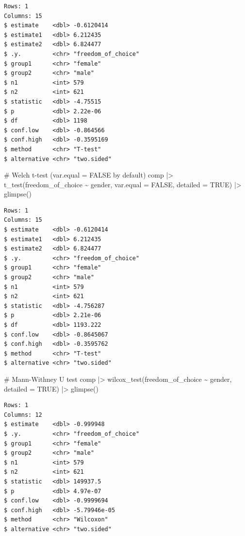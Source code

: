 \documentclass[
  letterpaper,
  DIV=11,
  numbers=noendperiod]{scrreprt}
\newenvironment{Shaded}{\begin{snugshade}}{\end{snugshade}}
\newcommand{\AttributeTok}[1]{\textcolor[rgb]{0.40,0.45,0.13}{#1}}
\newcommand{\CommentTok}[1]{\textcolor[rgb]{0.37,0.37,0.37}{#1}}
\newcommand{\ConstantTok}[1]{\textcolor[rgb]{0.56,0.35,0.01}{#1}}
\newcommand{\FunctionTok}[1]{\textcolor[rgb]{0.28,0.35,0.67}{#1}}
\newcommand{\NormalTok}[1]{\textcolor[rgb]{0.00,0.23,0.31}{#1}}
\newcommand{\SpecialCharTok}[1]{\textcolor[rgb]{0.37,0.37,0.37}{#1}}
\begin{document}
\begin{verbatim}
Rows: 1
Columns: 15
$ estimate    <dbl> -0.6120414
$ estimate1   <dbl> 6.212435
$ estimate2   <dbl> 6.824477
$ .y.         <chr> "freedom_of_choice"
$ group1      <chr> "female"
$ group2      <chr> "male"
$ n1          <int> 579
$ n2          <int> 621
$ statistic   <dbl> -4.75515
$ p           <dbl> 2.22e-06
$ df          <dbl> 1198
$ conf.low    <dbl> -0.864566
$ conf.high   <dbl> -0.3595169
$ method      <chr> "T-test"
$ alternative <chr> "two.sided"
\end{verbatim}

\begin{Shaded}
\begin{Highlighting}[]
\CommentTok{\# Welch t{-}test (var.equal = FALSE by default)}
\NormalTok{comp }\SpecialCharTok{|\textgreater{}} \FunctionTok{t\_test}\NormalTok{(freedom\_of\_choice }\SpecialCharTok{\textasciitilde{}}\NormalTok{ gender,}
                \AttributeTok{var.equal =} \ConstantTok{FALSE}\NormalTok{,}
                \AttributeTok{detailed =} \ConstantTok{TRUE}\NormalTok{) }\SpecialCharTok{|\textgreater{}}
  \FunctionTok{glimpse}\NormalTok{()}
\end{Highlighting}
\end{Shaded}

\begin{verbatim}
Rows: 1
Columns: 15
$ estimate    <dbl> -0.6120414
$ estimate1   <dbl> 6.212435
$ estimate2   <dbl> 6.824477
$ .y.         <chr> "freedom_of_choice"
$ group1      <chr> "female"
$ group2      <chr> "male"
$ n1          <int> 579
$ n2          <int> 621
$ statistic   <dbl> -4.756287
$ p           <dbl> 2.21e-06
$ df          <dbl> 1193.222
$ conf.low    <dbl> -0.8645067
$ conf.high   <dbl> -0.3595762
$ method      <chr> "T-test"
$ alternative <chr> "two.sided"
\end{verbatim}

\begin{Shaded}
\begin{Highlighting}[]
\CommentTok{\# Mann{-}Withney U test}
\NormalTok{comp }\SpecialCharTok{|\textgreater{}}
  \FunctionTok{wilcox\_test}\NormalTok{(freedom\_of\_choice }\SpecialCharTok{\textasciitilde{}}\NormalTok{ gender,}
              \AttributeTok{detailed =} \ConstantTok{TRUE}\NormalTok{) }\SpecialCharTok{|\textgreater{}}
  \FunctionTok{glimpse}\NormalTok{()}
\end{Highlighting}
\end{Shaded}

\begin{verbatim}
Rows: 1
Columns: 12
$ estimate    <dbl> -0.999948
$ .y.         <chr> "freedom_of_choice"
$ group1      <chr> "female"
$ group2      <chr> "male"
$ n1          <int> 579
$ n2          <int> 621
$ statistic   <dbl> 149937.5
$ p           <dbl> 4.97e-07
$ conf.low    <dbl> -0.9999694
$ conf.high   <dbl> -5.79946e-05
$ method      <chr> "Wilcoxon"
$ alternative <chr> "two.sided"
\end{verbatim}
\end{document}
